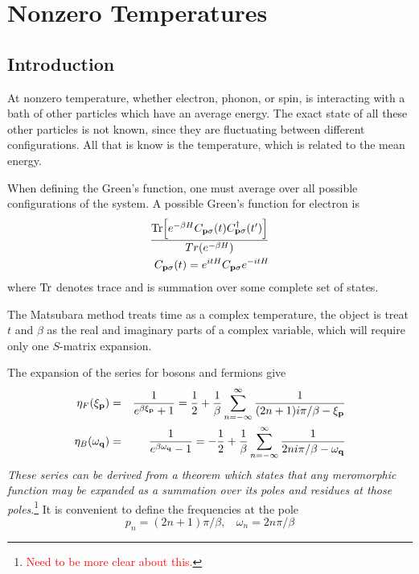 \chapter{Nonzero Temperatures}

\section{Introduction}\label{s3.1}
At nonzero temperature, whether electron, phonon, or spin, is interacting with a bath of other particles which have an average energy.
The exact state of all these other particles is not known, since they are fluctuating between different configurations.
All that is know is the temperature, which is related to the mean energy.


When defining the Green's function, one must average over all possible configurations of the system. A possible Green's function for electron is
\begin{eqnarray}
  \frac{\Tr[e^{-\beta H} C_{\mathbf{p} \sigma}(t) C^\dagger_{\mathbf{p} \sigma}(t')]}{Tr(e^{-\beta H})}  \label{3.1} \\
  C_{\mathbf{p} \sigma}(t) = e^{itH}C_{\mathbf{p}\sigma}e^{-itH}  \label{3.2}
\end{eqnarray}
where $\Tr$ denotes trace and is summation over some complete set of states.

The Matsubara method treats time as a complex temperature, the object is treat $t$ and $\beta$ as the real and imaginary parts of a complex variable, which will require only one $S$-matrix expansion.

The expansion of the series for bosons and fermions give
\begin{eqnarray}
  \eta_F(\xi_{\mathbf{p}}) &=& \frac{1}{e^{\beta \xi_{\mathbf{p}}}+1} = \frac{1}{2} + \frac{1}{\beta} \sum_{n=-\infty}^\infty \frac{1}{(2n+1)i\pi/\beta -\xi_{\mathbf{p}}} \label{3.5} \\
  \eta_B(\omega_{\mathbf{q}}) &=& \frac{1}{e^{\beta \omega_{\mathbf{q}}}-1} = -\frac{1}{2} + \frac{1}{\beta} \sum_{n=-\infty}^\infty \frac{1}{2ni\pi/\beta -\omega_{\mathbf{q}}} \label{3.6}
\end{eqnarray}
\textit{These series can be derived from a theorem which states that any meromorphic function may be expanded as a summation over its poles and residues at those poles}.\footnote{\textcolor{red}{Need to be more clear about this.}}
It is convenient to define the frequencies at the pole
\begin{equation}
  p_n = (2n+1)\pi/\beta,~ ~ ~ ~ \omega_n = 2n\pi/\beta \label{3.7}
\end{equation}

